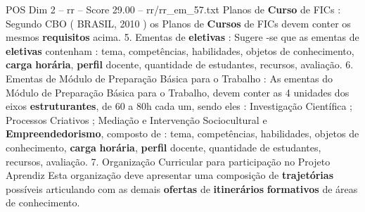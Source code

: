 \begin{textsample}{POS Dim 2 – rr – Score 29.00 – rr/rr\_em\_57.txt}
Planos de \textbf{Curso} de FICs : Segundo CBO ( BRASIL, 2010 ) os Planos de \textbf{Cursos} de FICs devem conter os mesmos \textbf{requisitos} acima. 5.
Ementas de \textbf{eletivas} : Sugere -se que as ementas de \textbf{eletivas} contenham : tema, competências, habilidades, objetos de conhecimento, \textbf{carga} \textbf{horária}, \textbf{perfil} docente, quantidade de estudantes, recursos, avaliação. 6.
Ementas de Módulo de Preparação Básica para o Trabalho : As ementas do Módulo de Preparação Básica para o Trabalho, devem conter as 4 unidades dos eixos \textbf{estruturantes}, de 60 a 80h cada um, sendo eles : Investigação Científica ; Processos Criativos ; Mediação e Intervenção Sociocultural e \textbf{Empreendedorismo}, composto de : tema, competências, habilidades, objetos de conhecimento, \textbf{carga} \textbf{horária}, \textbf{perfil} docente, quantidade de estudantes, recursos, avaliação. 7.
Organização Curricular para participação no Projeto Aprendiz Esta organização deve apresentar uma composição de \textbf{trajetórias} possíveis articulando com as demais \textbf{ofertas} de \textbf{itinerários} \textbf{formativos} de áreas de conhecimento.

\end{textsample}
